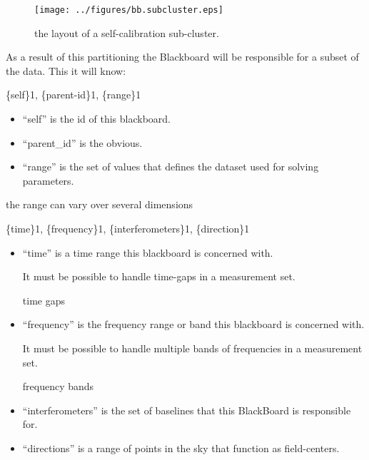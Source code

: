 \documentclass[]{lofar}
\begin{document}
      \begin{figure}
        \texttt{[image: ../figures/bb.subcluster.eps]}
        \hypertarget{fig:bb.subcluster}{}
        \caption{the layout of a self-calibration sub-cluster.\label{fig:bb.subcluster}}
      \end{figure}

      As a result of this partitioning the Blackboard will be
      responsible for a subset of the data. This it will know:

      \{self\}1, \{parent-id\}1, \{range\}1

      \begin{itemize}

        \item 

          ``self'' is the id of this blackboard.

        \item 

          ``parent\_id'' is the obvious.

        \item 

          ``range'' is the set of values that defines the dataset used
          for solving parameters.

      \end{itemize}

      the range can vary over several dimensions

      \{time\}1, \{frequency\}1, \{interferometers\}1, \{direction\}1

      \begin{itemize}

	\item 

          ``time'' is a time range this blackboard is concerned with.
          \begin{requirement}
            It must be possible to handle time-gaps in a measurement set.
            \caption{time gaps\label{req:time-gaps}}
          \end{requirement}

	\item 

          ``frequency'' is the frequency range or band this blackboard
          is concerned with.

          \begin{requirement}
            It must be possible to handle multiple bands of frequencies in a
            measurement set.
            \caption{frequency bands\label{req:frequency-bands}}
          \end{requirement}

	\item 

          ``interferometers'' is the set of baselines that this
          BlackBoard is responsible for.

	\item 

          ``directions'' is a range of points in the sky that function
          as field-centers.

      \end{itemize}
\end{document}
